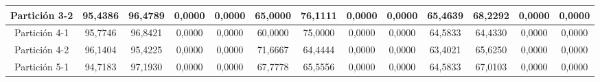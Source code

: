 \documentclass[12pt]{article}
\begin{document}
\begin{table}[H]
{\begin{tabular}{|c|cccc|cccc|cccc|}
Partición 3-2 & \multicolumn{1}{c|}{95,4386}                                                  & \multicolumn{1}{c|}{96,4789}                                                 & \multicolumn{1}{c|}{0,0000}  & 0,0000 & \multicolumn{1}{c|}{65,0000}                                                  & \multicolumn{1}{c|}{76,1111}                                                 & \multicolumn{1}{c|}{0,0000}  & 0,0000 & \multicolumn{1}{c|}{65,4639}                                                  & \multicolumn{1}{c|}{68,2292}                                                 & \multicolumn{1}{c|}{0,0000}  & 0,0000 \\ \hline
Partición 4-1 & \multicolumn{1}{c|}{95,7746}                                                  & \multicolumn{1}{c|}{96,8421}                                                 & \multicolumn{1}{c|}{0,0000}  & 0,0000 & \multicolumn{1}{c|}{60,0000}                                                  & \multicolumn{1}{c|}{75,0000}                                                 & \multicolumn{1}{c|}{0,0000}  & 0,0000 & \multicolumn{1}{c|}{64,5833}                                                  & \multicolumn{1}{c|}{64,4330}                                                 & \multicolumn{1}{c|}{0,0000}  & 0,0000 \\ \hline
Partición 4-2 & \multicolumn{1}{c|}{96,1404}                                                  & \multicolumn{1}{c|}{95,4225}                                                 & \multicolumn{1}{c|}{0,0000}  & 0,0000 & \multicolumn{1}{c|}{71,6667}                                                  & \multicolumn{1}{c|}{64,4444}                                                 & \multicolumn{1}{c|}{0,0000}  & 0,0000 & \multicolumn{1}{c|}{63,4021}                                                  & \multicolumn{1}{c|}{65,6250}                                                 & \multicolumn{1}{c|}{0,0000}  & 0,0000 \\ \hline
Partición 5-1 & \multicolumn{1}{c|}{94,7183}                                                  & \multicolumn{1}{c|}{97,1930}                                                 & \multicolumn{1}{c|}{0,0000}  & 0,0000 & \multicolumn{1}{c|}{67,7778}                                                  & \multicolumn{1}{c|}{65,5556}                                                 & \multicolumn{1}{c|}{0,0000}  & 0,0000 & \multicolumn{1}{c|}{64,5833}                                                  & \multicolumn{1}{c|}{67,0103}                                                 & \multicolumn{1}{c|}{0,0000}  & 0,0000 \\ \hline

\end{tabular}}
\end{table}
\end{document}
